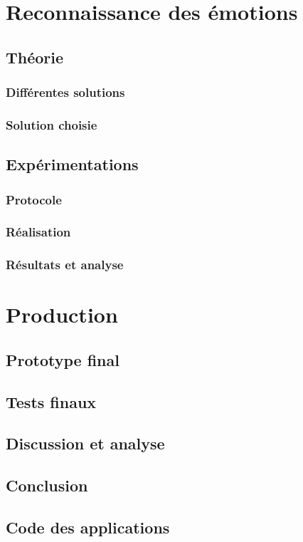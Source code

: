 \documentclass{report}
\begin{document}
	\part{Reconnaissance des \'emotions}
		\chapter{Th\'eorie}
			\section{Diff\'erentes solutions}
			\section{Solution choisie}
		\chapter{Exp\'erimentations}
			\section{Protocole}
			\section{R\'ealisation}
			\section{R\'esultats et analyse}
	\part{Production}
		\chapter{Prototype final}
		\chapter{Tests finaux}
		\chapter{Discussion et analyse}
	\chapter*{Conclusion}
\appendix
	\chapter{Code des applications}
\end{document}
